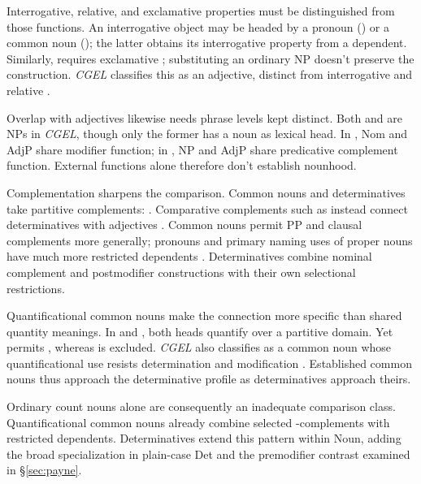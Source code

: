 \documentclass[12pt]{article}
\begin{document}
Interrogative, relative, and exclamative properties must be distinguished from those functions. An interrogative object may be headed by a pronoun () or a common noun (); the latter obtains its interrogative property from a dependent. Similarly,  requires exclamative ; substituting an ordinary NP doesn't preserve the construction. \textit{CGEL} classifies this  as an adjective, distinct from interrogative and relative  \citep[433--437; Ch.~10, §7]{huddleston2002}.

Overlap with adjectives likewise needs phrase levels kept distinct. Both  and  are NPs in \textit{CGEL}, though only the former has a noun as lexical head. In , Nom and AdjP share modifier function; in , NP and AdjP share predicative complement function. External functions alone therefore don't establish nounhood.

Complementation sharpens the comparison. Common nouns and determinatives take partitive complements: . Comparative complements such as  instead connect determinatives with adjectives \citep[349--350, 392--394, 411--412, 432--433]{huddleston2002}. Common nouns permit PP and clausal complements more generally; pronouns and primary naming uses of proper nouns have much more restricted dependents \citep[429--430, 439--443, 517--521]{huddleston2002}. Determinatives combine nominal complement and postmodifier constructions with their own selectional restrictions.

Quantificational common nouns make the connection more specific than shared quantity meanings. In  and , both heads quantify over a partitive domain. Yet  permits , whereas  is excluded. \textit{CGEL} also classifies  as a common noun whose quantificational use resists determination and modification \citep[349--350]{huddleston2002}. Established common nouns thus approach the determinative profile as determinatives approach theirs.

Ordinary count nouns alone are consequently an inadequate comparison class. Quantificational common nouns already combine selected -complements with restricted dependents. Determinatives extend this pattern within Noun, adding the broad specialization in plain-case Det and the premodifier contrast examined in §\ref{sec:payne}.
\end{document}
